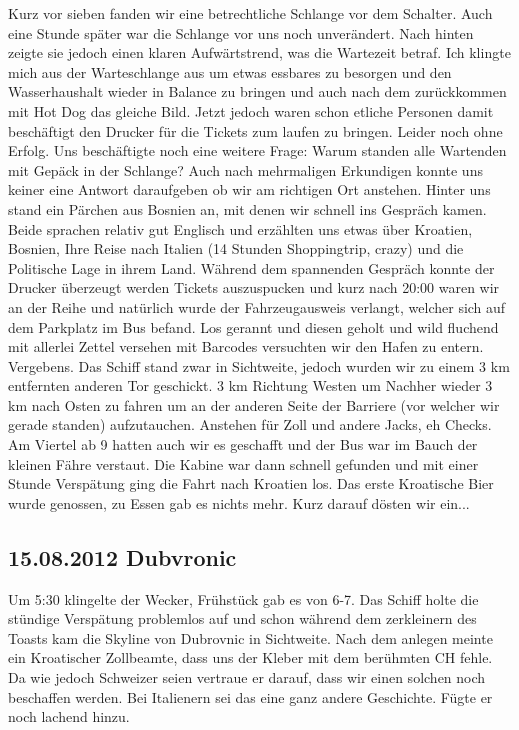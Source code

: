 Kurz vor sieben fanden wir eine betrechtliche Schlange vor dem Schalter.
Auch eine Stunde später war die Schlange vor uns noch unverändert.
Nach hinten zeigte sie jedoch einen klaren Aufwärtstrend, was die Wartezeit betraf.
Ich klingte mich aus der Warteschlange aus um etwas essbares zu besorgen und den Wasserhaushalt wieder in Balance zu bringen und auch nach dem zurückkommen mit Hot Dog das gleiche Bild.
Jetzt jedoch waren schon etliche Personen damit beschäftigt den Drucker für die Tickets zum laufen zu bringen.
Leider noch ohne Erfolg.
Uns beschäftigte noch eine weitere Frage: Warum standen alle Wartenden mit Gepäck in der Schlange? Auch nach mehrmaligen Erkundigen konnte uns keiner eine Antwort daraufgeben ob wir am richtigen Ort anstehen.
Hinter uns stand ein Pärchen aus Bosnien an, mit denen wir schnell ins Gespräch kamen.
Beide sprachen relativ gut Englisch und erzählten uns etwas über Kroatien, Bosnien, Ihre Reise nach Italien (14 Stunden Shoppingtrip, crazy) und die Politische Lage in ihrem Land.
Während dem spannenden Gespräch konnte der Drucker überzeugt werden Tickets auszuspucken und kurz nach 20:00 waren wir an der Reihe und natürlich wurde der Fahrzeugausweis verlangt, welcher sich auf dem Parkplatz im Bus befand.
Los gerannt und diesen geholt und wild fluchend mit allerlei Zettel versehen mit Barcodes versuchten wir den Hafen zu entern.
Vergebens.
Das Schiff stand zwar in Sichtweite, jedoch wurden wir zu einem 3 km entfernten anderen Tor geschickt.
3 km Richtung Westen um Nachher wieder 3 km nach Osten zu fahren um an der anderen Seite der Barriere (vor welcher wir gerade standen) aufzutauchen.
Anstehen für Zoll und andere Jacks, eh Checks.
Am Viertel ab 9 hatten auch wir es geschafft und der Bus war im Bauch der kleinen Fähre verstaut.
Die Kabine war dann schnell gefunden und mit einer Stunde Verspätung ging die Fahrt nach Kroatien los.
Das erste Kroatische Bier wurde genossen, zu Essen gab es nichts mehr. Kurz darauf dösten wir ein...

\subsection{15.08.2012 Dubvronic}
Um 5:30 klingelte der Wecker, Frühstück gab es von 6-7.
Das Schiff holte die stündige Verspätung problemlos auf und schon während dem zerkleinern des Toasts kam die \glqq Skyline \grqq von Dubrovnic in Sichtweite.
Nach dem anlegen meinte ein Kroatischer Zollbeamte, dass uns der Kleber mit dem berühmten \glqq CH \grqq fehle.
Da wie jedoch Schweizer seien vertraue er darauf, dass wir einen solchen noch beschaffen werden.
Bei Italienern sei das eine ganz andere Geschichte.
Fügte er noch lachend hinzu.

